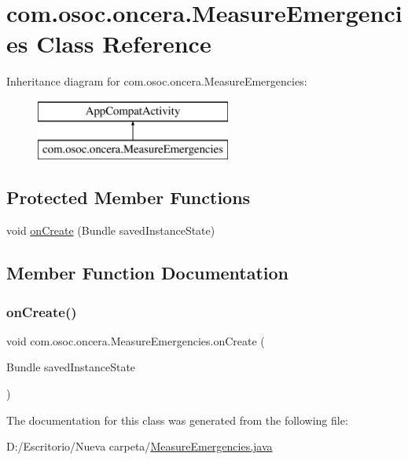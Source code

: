 \hypertarget{classcom_1_1osoc_1_1oncera_1_1_measure_emergencies}{}\section{com.\+osoc.\+oncera.\+Measure\+Emergencies Class Reference}
\label{classcom_1_1osoc_1_1oncera_1_1_measure_emergencies}
Inheritance diagram for com.\+osoc.\+oncera.\+Measure\+Emergencies\+:\begin{figure}[H]
\begin{center}
\leavevmode
\includegraphics[height=2.000000cm]{classcom_1_1osoc_1_1oncera_1_1_measure_emergencies}
\end{center}
\end{figure}
\subsection*{Protected Member Functions}
\begin{DoxyCompactItemize}
\item 
void \mbox{\hyperlink{classcom_1_1osoc_1_1oncera_1_1_measure_emergencies_ae1fd7c9de1bbf810129fbc42ca0e91cd}{on\+Create}} (Bundle saved\+Instance\+State)
\end{DoxyCompactItemize}


\subsection{Member Function Documentation}
\mbox{\label{classcom_1_1osoc_1_1oncera_1_1_measure_emergencies_ae1fd7c9de1bbf810129fbc42ca0e91cd}} 
\subsubsection{\texorpdfstring{onCreate()}{onCreate()}}
{\footnotesize\ttfamily void com.\+osoc.\+oncera.\+Measure\+Emergencies.\+on\+Create (\begin{DoxyParamCaption}\item[{Bundle}]{saved\+Instance\+State }\end{DoxyParamCaption})\hspace{0.3cm}{\ttfamily [protected]}}



The documentation for this class was generated from the following file\+:\begin{DoxyCompactItemize}
\item 
D\+:/\+Escritorio/\+Nueva carpeta/\mbox{\hyperlink{_measure_emergencies_8java}{Measure\+Emergencies.\+java}}\end{DoxyCompactItemize}
